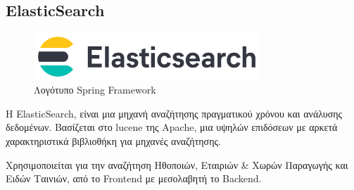 \subsection{ElasticSearch}

\begin{figure}[h]
  \centering
  \includegraphics[width=85mm]{Chapters/3 - Technologies/Images/elastic-search-logo-color-horizontal.png}
  \caption{Λογότυπο Spring Framework}
  \label{fig:elasticsearch-logo}
\end{figure}
Η ElasticSearch, είναι μια μηχανή αναζήτησης πραγματικού χρόνου και ανάλυσης δεδομένων. Βασίζεται στο lucene της Apache, μια υψηλών επιδόσεων με αρκετά χαρακτηριστικά βιβλιοθήκη για μηχανές αναζήτησης. ~\citep{wiki:elastic}

Χρησιμοποιείται για την αναζήτηση Ηθοποιών, Εταιριών \& Χωρών Παραγωγής και Ειδών Ταινιών, από το Frontend με μεσολαβητή το Backend.